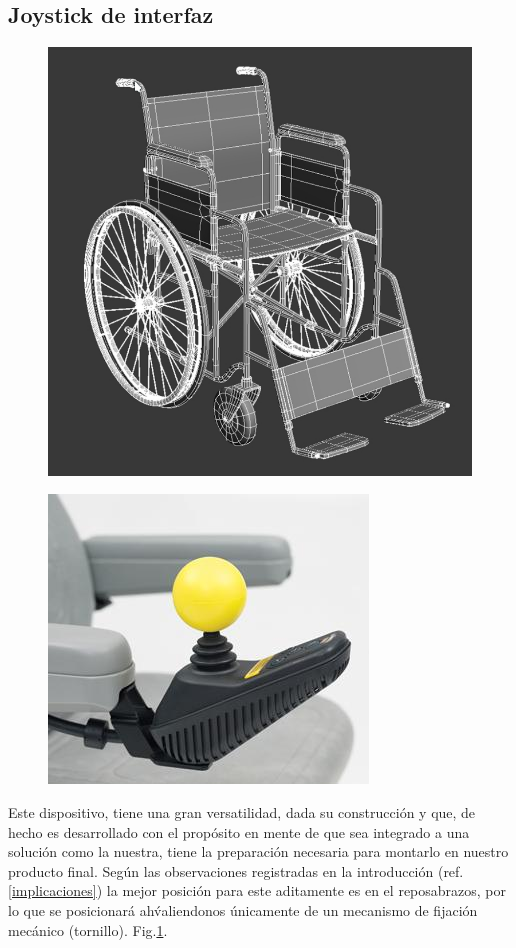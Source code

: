 \subsection{Joystick de interfaz}
\begin{figure}[th]
\centering
\begin{minipage}{.5\textwidth}
  \centering
  \includegraphics[width=.7\linewidth]{Figures/wheel_lateral.png}
\end{minipage}%
\begin{minipage}{.5\textwidth}
  \centering
  \includegraphics[width=.7\linewidth]{Figures/joystick.jpg}
  \label{fig:joy}
\end{minipage}
\end{figure}

Este dispositivo, tiene una gran versatilidad, dada su construcci\'on y que, de
hecho es desarrollado con el prop\'osito en mente de que sea integrado a una
soluci\'on como la nuestra, tiene la preparaci\'on necesaria para montarlo en
nuestro producto final. Seg\'un las observaciones registradas en la
introducci\'on (ref.\ref{implicaciones}) la mejor posici\'on para este
aditamente es en el reposabrazos, por lo que  se posicionar\'a ah\' valiendonos
\'unicamente de un mecanismo de fijaci\'on mec\'anico (tornillo).
Fig.\ref{fig:joy}.

